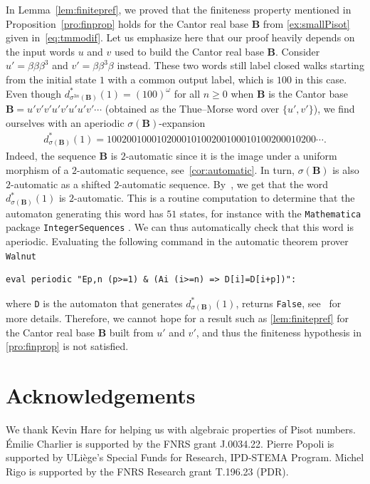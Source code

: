 \documentclass[12pt,reqno]{amsart}
\newcommand{\B}{{\mathbf{B}}}
\begin{document}
\begin{remark} 
\label{rem:Aperiodic-112-221}
    In Lemma~\ref{lem:finitepref}, we proved that the finiteness property mentioned in Proposition~\ref{pro:finprop} holds for the Cantor real base $\B$ from \cref{ex:smallPisot} given in~\eqref{eq:tmmodif}.
    Let us emphasize here that our proof heavily depends on the input words $u$ and $v$ used to build the Cantor real base $\B$. Consider $u'=\beta\beta\beta^3$ and $v'=\beta\beta^3\beta$ instead. These two words still label closed walks starting from the initial state $1$ with a common output label, which is $100$ in this case. Even though $d_{\sigma^{3n}(\B)}^*(1)=(100)^\omega$ for all $n\ge 0$ when $\B$ is the Cantor base $\B=u'v'v'u'v'u'u'v'\cdots$ (obtained as the Thue--Morse word over $\{u',v'\}$), we find ourselves with an aperiodic $\sigma(\B)$-expansion
    \begin{align*}
        d_{\sigma(\B)}^*(1)=100200100010200010100200100010100200010200\cdots.
    \end{align*} 
    Indeed, the sequence $\B$ is $2$-automatic since it is the image under a uniform morphism of a $2$-automatic sequence, see~\cref{cor:automatic}. In turn, $\sigma(\B)$ is also $2$-automatic as a shifted $2$-automatic sequence. By~, we get that the word $d_{\sigma(\B)}^*(1)$ is $2$-automatic. This is a routine computation to determine that the automaton generating this word has $51$ states, for instance with the {\tt Mathematica} package {\tt IntegerSequences} \cite{IntSeq}. We can thus automatically check that this word is aperiodic.  Evaluating the following command in the automatic theorem prover \texttt{Walnut}
\begin{verbatim}
eval periodic "Ep,n (p>=1) & (Ai (i>=n) => D[i]=D[i+p])":
\end{verbatim} where \texttt{D} is the automaton that generates $d_{\sigma(\B)}^{*}(1)$, returns {\tt False}, see~\cite{ShallitBook} for more details. Therefore, we cannot hope for a result such as \cref{lem:finitepref} for the Cantor real base $\B$ built from $u'$ and $v'$, and thus the finiteness hypothesis in \cref{pro:finprop} is not satisfied. 
\end{remark}

\section{Acknowledgements}
We thank Kevin Hare for helping us with algebraic properties of Pisot numbers. 
 Émilie Charlier is supported by the FNRS grant J.0034.22.
 Pierre Popoli is supported by ULiège's Special Funds for Research, IPD-STEMA Program. 
 Michel Rigo is supported by the FNRS Research grant T.196.23 (PDR). 



\end{document}
